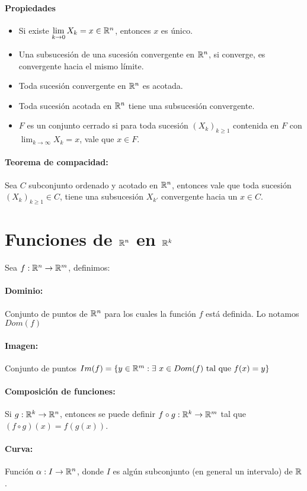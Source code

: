 \paragraph{Propiedades}
\begin{itemize}
\item Si existe $\lim_{k\rightarrow 0}\limits X_k = x\in\mathbb{R}^n$, entonces $x$ es único.
\item Una subsucesión de una sucesión convergente en $\mathbb{R}^n$, si converge, es convergente hacia el mismo límite.
\item Toda sucesión convergente en $\mathbb{R}^n$ es acotada.
\item Toda sucesión acotada en $\mathbb{R}^n$ tiene una subsucesión convergente.
\item $F$ es un conjunto cerrado si para toda sucesión $(X_k)_{k\geq 1}$ contenida en $F$ con $\lim_{k\rightarrow\infty}\limits X_k = x$, vale que $x\in F$.
\end{itemize}
\paragraph{Teorema de compacidad:} Sea $C$ subconjunto ordenado y acotado en $\mathbb{R}^n$, entonces vale que toda sucesión $(X_k)_{k\geq 1}\in C$, tiene una subsucesión $X_{k'}$ convergente hacia un $x\in C$.
\newpage
\section{\texorpdfstring{Funciones de $\mathbb{R}^n$ en $\mathbb{R}^k$}{Funciones de varias variables}}
Sea $f : \mathbb{R}^n\rightarrow \mathbb{R}^m$, definimos:
\paragraph{Dominio:} Conjunto de puntos de $\mathbb{R}^n$ para los cuales la función $f$ está definida. Lo notamos $Dom(f)$
\paragraph{Imagen:} Conjunto de puntos $Im(f)=\{y\in\mathbb{R}^m : \exists~x\in Dom(f) \text{ tal que } f(x) = y\}$
\paragraph{Composición de funciones: } Si $g : \mathbb{R}^k\rightarrow \mathbb{R}^n$, entonces se puede definir $f\circ g : \mathbb{R}^k\rightarrow \mathbb{R}^m$ tal que $(f\circ g)(x) = f(g(x))$.
\paragraph{Curva:} Función $\alpha : I\rightarrow \mathbb{R}^n$, donde $I$ es algún subconjunto (en general un intervalo) de $\mathbb{R}$.
